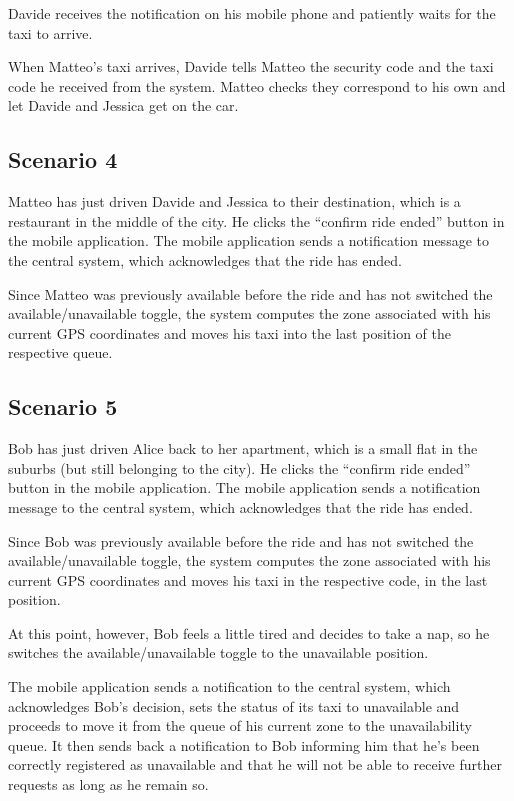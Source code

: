 Davide receives the notification on his mobile phone and patiently waits for the taxi to arrive.

When Matteo's taxi arrives, Davide tells Matteo the security code and the taxi code he received from the system. Matteo checks they correspond to his own and let Davide and Jessica get on the car.


\subsection{Scenario 4}
Matteo has just driven Davide and Jessica to their destination, which is a restaurant in the middle of the city. He clicks the ``confirm ride ended'' button in the mobile application. The mobile application sends a notification message to the central system, which acknowledges that the ride has ended.

Since Matteo was previously available before the ride and has not switched the available/unavailable toggle, the system computes the zone associated with his current GPS coordinates and moves his taxi into the last position of the respective queue.


\subsection{Scenario 5}
Bob has just driven Alice back to her apartment, which is a small flat in the suburbs (but still belonging to the city). He clicks the ``confirm ride ended'' button in the mobile application. The mobile application sends a notification message to the central system, which acknowledges that the ride has ended.

Since Bob was previously available before the ride and has not switched the available/unavailable toggle, the system computes the zone associated with his current GPS coordinates and moves his taxi in the respective code, in the last position.

At this point, however, Bob feels a little tired and decides to take a nap, so he switches the available/unavailable toggle to the unavailable position.

The mobile application sends a notification to the central system, which acknowledges Bob's decision, sets the status of its taxi to unavailable and proceeds to move it from the queue of his current zone to the unavailability queue. It then sends back a notification to Bob informing him that he’s been correctly registered as unavailable and that he will not be able to receive further requests as long as he remain so.

